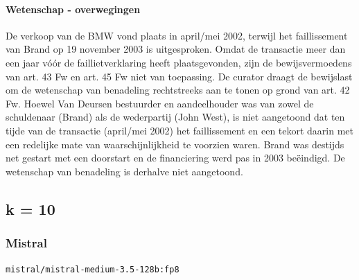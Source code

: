 \documentclass[
  dutch,
  a4paper,
]{article}
\begin{document}
\paragraph{Wetenschap - overwegingen}\label{wetenschap---overwegingen-59}

De verkoop van de BMW vond plaats in april/mei 2002, terwijl het faillissement van Brand op 19 november 2003 is uitgesproken. Omdat de transactie meer dan een jaar vóór de faillietverklaring heeft plaatsgevonden, zijn de bewijsvermoedens van art. 43 Fw en art. 45 Fw niet van toepassing. De curator draagt de bewijslast om de wetenschap van benadeling rechtstreeks aan te tonen op grond van art. 42 Fw. Hoewel Van Deursen bestuurder en aandeelhouder was van zowel de schuldenaar (Brand) als de wederpartij (John West), is niet aangetoond dat ten tijde van de transactie (april/mei 2002) het faillissement en een tekort daarin met een redelijke mate van waarschijnlijkheid te voorzien waren. Brand was destijds net gestart met een doorstart en de financiering werd pas in 2003 beëindigd. De wetenschap van benadeling is derhalve niet aangetoond.

\newpage


\subsection{k = 10}\label{k-10-6}

\subsubsection{Mistral}\label{mistral-20}

\texttt{mistral/mistral-medium-3.5-128b:fp8}
\end{document}
